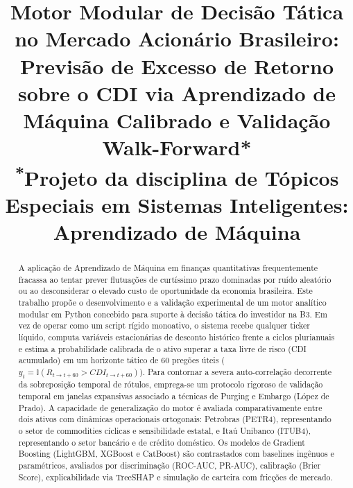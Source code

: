 \documentclass[conference]{IEEEtran}
\begin{document}
\title{Motor Modular de Decisão Tática no Mercado Acionário Brasileiro: Previsão de Excesso de Retorno sobre o CDI via Aprendizado de Máquina Calibrado e Validação Walk-Forward*\\
{\footnotesize \textsuperscript{*}Projeto da disciplina de Tópicos Especiais em Sistemas Inteligentes: Aprendizado de Máquina}
}

\author{
}

\maketitle

\begin{abstract}
A aplicação de Aprendizado de Máquina em finanças quantitativas frequentemente fracassa ao tentar prever flutuações de curtíssimo prazo dominadas por ruído aleatório ou ao desconsiderar o elevado custo de oportunidade da economia brasileira. Este trabalho propõe o desenvolvimento e a validação experimental de um motor analítico modular em Python concebido para suporte à decisão tática do investidor na B3. Em vez de operar como um script rígido monoativo, o sistema recebe qualquer ticker líquido, computa variáveis estacionárias de desconto histórico frente a ciclos plurianuais e estima a probabilidade calibrada de o ativo superar a taxa livre de risco (CDI acumulado) em um horizonte tático de 60 pregões úteis ($y_t = \mathbb{I}(R_{t \to t+60} > CDI_{t \to t+60})$). Para contornar a severa auto-correlação decorrente da sobreposição temporal de rótulos, emprega-se um protocolo rigoroso de validação temporal em janelas expansivas associado a técnicas de Purging e Embargo (López de Prado). A capacidade de generalização do motor é avaliada comparativamente entre dois ativos com dinâmicas operacionais ortogonais: Petrobras (PETR4), representando o setor de commodities cíclicas e sensibilidade estatal, e Itaú Unibanco (ITUB4), representando o setor bancário e de crédito doméstico. Os modelos de Gradient Boosting (LightGBM, XGBoost e CatBoost) são contrastados com baselines ingênuos e paramétricos, avaliados por discriminação (ROC-AUC, PR-AUC), calibração (Brier Score), explicabilidade via TreeSHAP e simulação de carteira com fricções de mercado.
\end{abstract}
\end{document}
